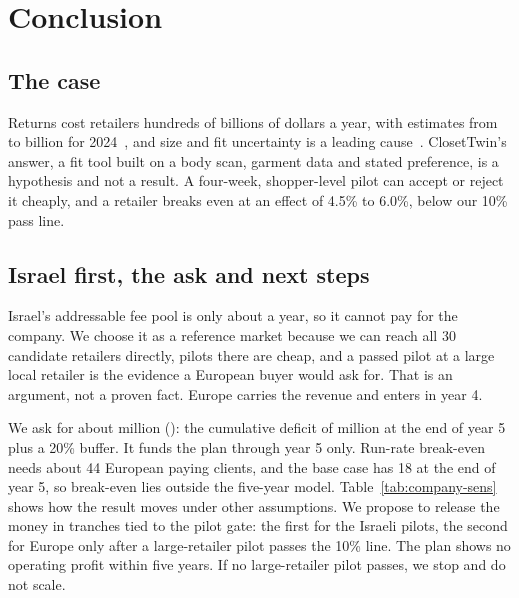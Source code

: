 \chapter{Conclusion}\label{ch:conclusion}

\section{The case}\label{sec:case}
Returns cost retailers hundreds of billions of dollars a year, with estimates from  to  billion for 2024~\cite{appriss2024,nrf2024}, and size and fit uncertainty is a leading cause~\cite{coresight2023}. ClosetTwin's answer, a fit tool built on a body scan, garment data and stated preference, is a hypothesis and not a result. A four-week, shopper-level pilot can accept or reject it cheaply, and a retailer breaks even at an effect of 4.5\% to 6.0\%, below our 10\% pass line.

\section{Israel first, the ask and next steps}\label{sec:ask}
Israel's addressable fee pool is only about  a year, so it cannot pay for the company. We choose it as a reference market because we can reach all 30 candidate retailers directly, pilots there are cheap, and a passed pilot at a large local retailer is the evidence a European buyer would ask for. That is an argument, not a proven fact. Europe carries the revenue and enters in year 4.

We ask for about  million (): the cumulative deficit of  million at the end of year 5 plus a 20\% buffer. It funds the plan through year 5 only. Run-rate break-even needs about 44 European paying clients, and the base case has 18 at the end of year 5, so break-even lies outside the five-year model. Table~\ref{tab:company-sens} shows how the result moves under other assumptions. We propose to release the money in tranches tied to the pilot gate: the first for the Israeli pilots, the second for Europe only after a large-retailer pilot passes the 10\% line. The plan shows no operating profit within five years. If no large-retailer pilot passes, we stop and do not scale.
\ctchapterend
